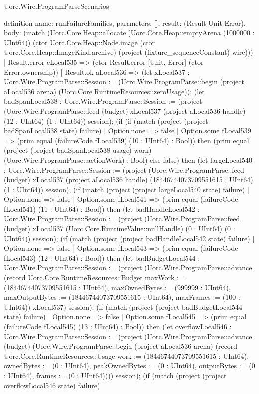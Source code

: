\begin{lexlean}{Uorc.Wire.ProgramParseScenarios}
\begin{semanticmodule}
definition{
  name: runFailureFamilies,
  parameters: [],
  result: (Result Unit Error),
  body: (match (Uorc.Core.Heap::allocate (Uorc.Core.Heap::emptyArena (1000000 : UInt64)) (ctor Uorc.Core.Heap::Node.image (ctor Uorc.Core.Heap::ImageKind.archive) (project (fixture_sequenceConstant) wire)))
    | Result.error eLocal535 => (ctor Result.error [Unit, Error] (ctor Error.ownership))
    | Result.ok aLocal536 => (let xLocal537 : Uorc.Wire.ProgramParse::Session := (Uorc.Wire.ProgramParse::begin (project aLocal536 arena) (Uorc.Core.RuntimeResources::zeroUsage)); (let badSpanLocal538 : Uorc.Wire.ProgramParse::Session := (project (Uorc.Wire.ProgramParse::feed (budget) xLocal537 (project aLocal536 handle) (12 : UInt64) (1 : UInt64)) session); (if (if (match (project (project badSpanLocal538 state) failure)
      | Option.none => false
      | Option.some fLocal539 => (prim equal (failureCode fLocal539) (10 : UInt64) : Bool)) then (prim equal (project (project badSpanLocal538 usage) work) (Uorc.Wire.ProgramParse::actionWork) : Bool) else false) then (let largeLocal540 : Uorc.Wire.ProgramParse::Session := (project (Uorc.Wire.ProgramParse::feed (budget) xLocal537 (project aLocal536 handle) (18446744073709551615 : UInt64) (1 : UInt64)) session); (if (match (project (project largeLocal540 state) failure)
      | Option.none => false
      | Option.some fLocal541 => (prim equal (failureCode fLocal541) (11 : UInt64) : Bool)) then (let badHandleLocal542 : Uorc.Wire.ProgramParse::Session := (project (Uorc.Wire.ProgramParse::feed (budget) xLocal537 (Uorc.Core.RuntimeValue::nullHandle) (0 : UInt64) (0 : UInt64)) session); (if (match (project (project badHandleLocal542 state) failure)
      | Option.none => false
      | Option.some fLocal543 => (prim equal (failureCode fLocal543) (12 : UInt64) : Bool)) then (let badBudgetLocal544 : Uorc.Wire.ProgramParse::Session := (project (Uorc.Wire.ProgramParse::advance (record Uorc.Core.RuntimeResources::Budget {maxWork := (18446744073709551615 : UInt64), maxOwnedBytes := (999999 : UInt64), maxOutputBytes := (18446744073709551615 : UInt64), maxFrames := (100 : UInt64)}) xLocal537) session); (if (match (project (project badBudgetLocal544 state) failure)
      | Option.none => false
      | Option.some fLocal545 => (prim equal (failureCode fLocal545) (13 : UInt64) : Bool)) then (let overflowLocal546 : Uorc.Wire.ProgramParse::Session := (project (Uorc.Wire.ProgramParse::advance (budget) (Uorc.Wire.ProgramParse::begin (project aLocal536 arena) (record Uorc.Core.RuntimeResources::Usage {work := (18446744073709551615 : UInt64), ownedBytes := (0 : UInt64), peakOwnedBytes := (0 : UInt64), outputBytes := (0 : UInt64), frames := (0 : UInt64)}))) session); (if (match (project (project overflowLocal546 state) failure)
}
\end{semanticmodule}
\end{lexlean}
